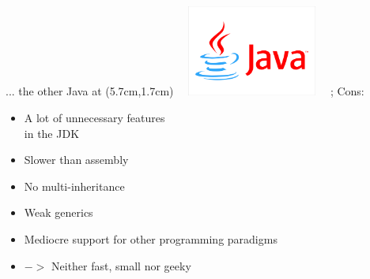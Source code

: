 \begin{frame}{... the other Java}
	\tikzoverlay at (5.7cm,1.7cm) {
		\includegraphics[width=5cm, height=3cm]{res/logo-java.jpg}
	};
	Cons:
	\begin{itemize}
		\item A lot of unnecessary features \\ in the JDK
		\item Slower than assembly
		\item No multi-inheritance
		\item Weak generics
		\item Mediocre support for other programming paradigms
		\item[] $->$ Neither fast, small nor geeky
	\end{itemize}	
\end{frame}
% 
% 
% 
